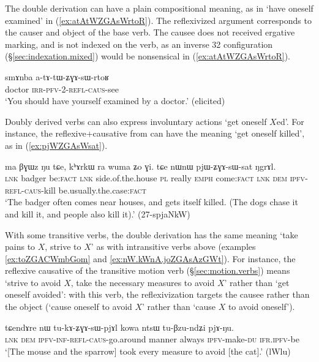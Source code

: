 The double derivation can have a plain compositional meaning, as in  `have oneself examined' in (\ref{ex:atAtWZGAsWrtoR}). The reflexivized argument corresponds to the causer and object of the base verb. The causee  does not received ergative marking, and is not indexed on the verb, as an inverse 3\fl{}2 configuration (§\ref{sec:indexation.mixed}) would be nonsensical in (\ref{ex:atAtWZGAsWrtoR}).


\begin{exe}
\ex \label{ex:atAtWZGAsWrtoR}
\gll smɤnba a-tɤ-tɯ-ʑɣɤ-sɯ-rtoʁ \\
doctor \textsc{irr}-\textsc{pfv}-2-\textsc{refl}-\textsc{caus}-see \\
\glt `You should have yourself examined by a doctor.' (elicited)
\end{exe}

Doubly derived verbs can also express involuntary actions `get oneself $X$ed'. For instance, the reflexive+causative  from  can have the meaning `get oneself killed', as in (\ref{ex:pjWZGAsWsat}).

\begin{exe}
\ex \label{ex:pjWZGAsWsat}
\gll ma βɣɯz ŋu tɕe, kʰɤrkɯ ra wuma ʑo ɣi. tɕe nɯnɯ pjɯ-ʑɣɤ-sɯ-sat ŋgrɤl. \\ 
\textsc{lnk} badger be:\textsc{fact} \textsc{lnk} side.of.the.house \textsc{pl} really \textsc{emph} come:\textsc{fact} \textsc{lnk} \textsc{dem} \textsc{ipfv}-\textsc{refl}-\textsc{caus}-kill be.usually.the.case:\textsc{fact} \\ 
\glt `The badger often comes near houses, and gets itself killed. (The dogs chase it and kill it, and people also kill it).' (27-spjaNkW)
\end{exe}

With some transitive verbs, the double derivation has the same meaning `take pains to $X$, strive to $X$' as with intransitive verbs above (examples \ref{ex:toZGACWmbGom} and \ref{ex:nW.kWnA.joZGAsAzGWt}). For instance, the reflexive causative  of the transitive motion verb  (§\ref{sec:motion.verbs}) means `strive to avoid $X$, take the necessary measures to avoid $X$' rather than `get oneself avoided': with this verb, the reflexivization targets the causee rather than the object (`cause oneself to avoid $X$' rather than `cause $X$ to avoid oneself').

\begin{exe}
\ex \label{ex:tukAZGAsWpjAl.kowa}
\gll tɕendɤre nɯ tu-kɤ-ʑɣɤ-sɯ-pjɤl kowa ntsɯ tu-βzu-ndʑi pjɤ-ŋu. \\
\textsc{lnk} \textsc{dem} \textsc{ipfv}-\textsc{inf}-\textsc{refl}-\textsc{caus}-go.around manner always \textsc{ipfv}-make-\textsc{du} \textsc{ifr}.\textsc{ipfv}-be \\
\glt `[The mouse and the sparrow] took every measure to avoid [the cat].' (lWlu)
\end{exe}


